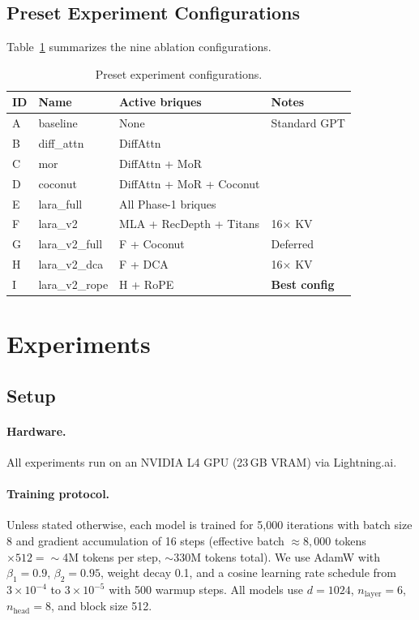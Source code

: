 \documentclass{article}
\begin{document}
\subsection{Preset Experiment Configurations}

Table~\ref{tab:configs} summarizes the nine ablation configurations.

\begin{table}[h]
\centering
\caption{Preset experiment configurations.}
\label{tab:configs}
\small
\begin{tabular}{llll}
\toprule
ID & Name & Active briques & Notes \\
\midrule
A & baseline & None & Standard GPT \\
B & diff\_attn & DiffAttn & \\
C & mor & DiffAttn + MoR & \\
D & coconut & DiffAttn + MoR + Coconut & \\
E & lara\_full & All Phase-1 briques & \\
F & lara\_v2 & MLA + RecDepth + Titans & 16$\times$ KV \\
G & lara\_v2\_full & F + Coconut & Deferred \\
H & lara\_v2\_dca & F + DCA & 16$\times$ KV \\
I & lara\_v2\_rope & H + RoPE & \textbf{Best config} \\
\bottomrule
\end{tabular}
\end{table}

\section{Experiments}

\subsection{Setup}

\paragraph{Hardware.} All experiments run on an NVIDIA L4 GPU (23\,GB VRAM) via Lightning.ai.

\paragraph{Training protocol.} Unless stated otherwise, each model is trained for 5{,}000 iterations with batch size 8 and gradient accumulation of 16 steps (effective batch $\approx 8{,}000$ tokens $\times 512 = \sim$4M tokens per step, $\sim$330M tokens total). We use AdamW \citep{loshchilov2019decoupledweightdecayregularization} with $\beta_1 = 0.9$, $\beta_2 = 0.95$, weight decay 0.1, and a cosine learning rate schedule from $3\times10^{-4}$ to $3\times10^{-5}$ with 500 warmup steps. All models use $d = 1024$, $n_\text{layer} = 6$, $n_\text{head} = 8$, and block size 512.
\end{document}

